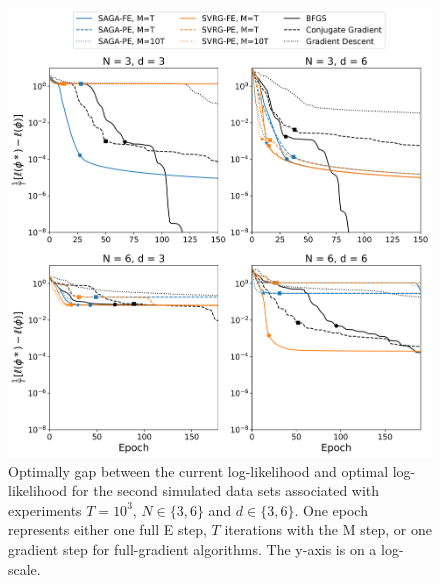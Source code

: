\documentclass[12pt]{article}
\begin{document}
\begin{figure}[H]
    \centering
    \includegraphics[width=6.5in]{../plt/log-like_v_epoch_T-1000-001.png}
    \caption{Optimally gap between the current log-likelihood and optimal log-likelihood for the second simulated data sets associated with experiments $T=10^{3}$, $N \in \{3,6\}$ and $d \in \{3,6\}$. One epoch represents either one full E step, $T$ iterations with the M step, or one gradient step for full-gradient algorithms. The y-axis is on a log-scale.}
\end{figure}
%
\end{document}
